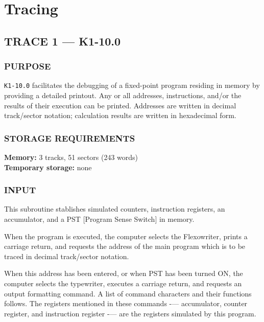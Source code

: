 \section{Tracing}
\subsection*{TRACE 1 --- K1-10.0}

\subsubsection*{PURPOSE}
\texttt{K1-10.0} facilitates the debugging of a fixed-point program residing in memory by providing a detailed printout. Any or all addresses, instructions, and/or the results of their execution can be printed. Addresses are written in decimal track/sector notation; calculation results are written in hexadecimal form.

\subsubsection*{STORAGE REQUIREMENTS}
\textbf{Memory:} 3 tracks, 51 sectors (243 words) \\
\textbf{Temporary storage:} none

\subsubsection*{INPUT}
This subroutine stablishes simulated counters, instruction registers, an accumulator, and a \textsf{PST} [Program Sense Switch] in memory.

When the program is executed, the computer selects the Flexowriter, prints a carriage return, and requests the address of the main program which is to be traced in decimal track/sector notation.

When this address has been entered, or when \textsf{PST} has been turned \textsf{ON}, the computer selects the typewriter, executes a carriage return, and requests an output formatting command. A list of command characters and their functions follows. The registers mentioned in these commands -— accumulator, counter register, and instruction register -— are the registers simulated by this program.

